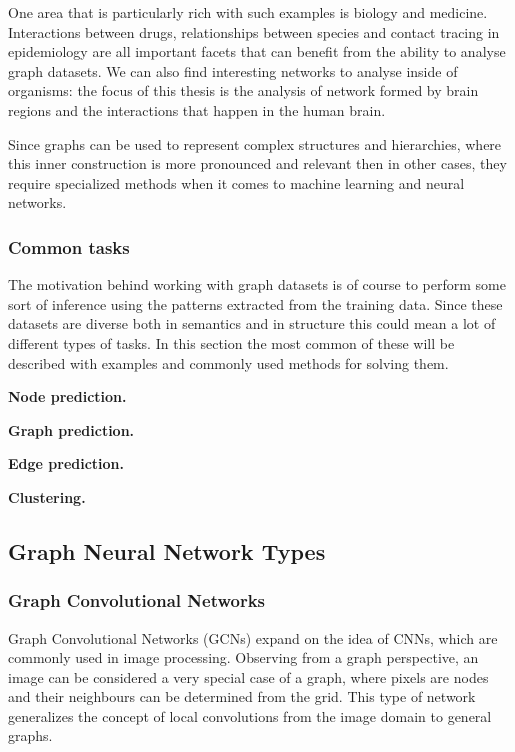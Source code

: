 	One area that is particularly rich with such examples is biology and medicine. Interactions between drugs, relationships between species and contact tracing in epidemiology are all important facets that can benefit from the ability to analyse 
	graph datasets. We can also find interesting networks to analyse inside of organisms: the focus of this thesis is the analysis of network formed by brain regions and the interactions that happen in the human brain.
	
	Since graphs can be used to represent complex structures and hierarchies, where this inner construction is more pronounced and relevant then in other cases, they require specialized methods when it comes to machine learning and neural networks.
	
	
		\subsubsection{Common tasks}
		
		The motivation behind working with graph datasets is of course to perform some sort of inference using the patterns extracted from the training data. Since these datasets are diverse both in semantics and in structure this could mean a lot of different types of tasks. In this section the most common of these will be described with examples and commonly used methods for solving them.
		
		\textbf{Node prediction.}
		
		\textbf{Graph prediction.}
		
		\textbf{Edge prediction.}
		
		\textbf{Clustering.}
	
	\subsection{Graph Neural Network Types}
	
	
		\subsubsection{Graph Convolutional Networks}
		
		Graph Convolutional Networks (GCNs) expand on the idea of CNNs, which are commonly used in image processing. Observing from a graph perspective, an image can be considered a very special case of a graph, where pixels are nodes and their neighbours can be determined from the grid. This type of network generalizes the concept of local convolutions from the image domain to general graphs.
		
